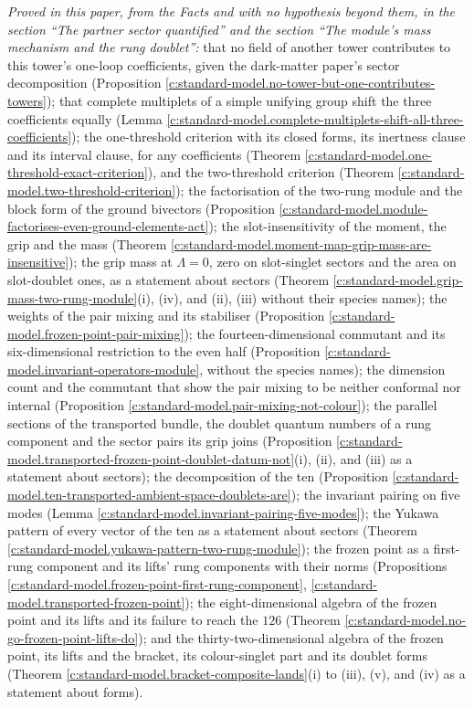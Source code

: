 \documentclass[11pt]{article}
\theoremstyle{definition}
\theoremstyle{plain}
\begin{document}
\emph{Proved in this paper, from the Facts and with no hypothesis beyond them, in the section ``The partner sector quantified'' and the section ``The module's mass mechanism and the rung doublet'':} that no field of another tower contributes to this tower's one-loop coefficients, given the dark-matter paper's sector decomposition (Proposition \ref{c:standard-model.no-tower-but-one-contributes-towers}); that complete multiplets of a simple unifying group shift the three coefficients equally (Lemma \ref{c:standard-model.complete-multiplets-shift-all-three-coefficients}); the one-threshold criterion with its closed forms, its inertness clause and its interval clause, for any coefficients (Theorem \ref{c:standard-model.one-threshold-exact-criterion}), and the two-threshold criterion (Theorem \ref{c:standard-model.two-threshold-criterion}); the factorisation of the two-rung module and the block form of the ground bivectors (Proposition \ref{c:standard-model.module-factorises-even-ground-elements-act}); the slot-insensitivity of the moment, the grip and the mass (Theorem \ref{c:standard-model.moment-map-grip-mass-are-insensitive}); the grip mass at $\Lambda = 0$, zero on slot-singlet sectors and the area on slot-doublet ones, as a statement about sectors (Theorem \ref{c:standard-model.grip-mass-two-rung-module}(i), (iv), and (ii), (iii) without their species names); the weights of the pair mixing and its stabiliser (Proposition \ref{c:standard-model.frozen-point-pair-mixing}); the fourteen-dimensional commutant and its six-dimensional restriction to the even half (Proposition \ref{c:standard-model.invariant-operators-module}, without the species names); the dimension count and the commutant that show the pair mixing to be neither conformal nor internal (Proposition \ref{c:standard-model.pair-mixing-not-colour}); the parallel sections of the transported bundle, the doublet quantum numbers of a rung component and the sector pairs its grip joins (Proposition \ref{c:standard-model.transported-frozen-point-doublet-datum-not}(i), (ii), and (iii) as a statement about sectors); the decomposition of the ten (Proposition \ref{c:standard-model.ten-transported-ambient-space-doublets-are}); the invariant pairing on five modes (Lemma \ref{c:standard-model.invariant-pairing-five-modes}); the Yukawa pattern of every vector of the ten as a statement about sectors (Theorem \ref{c:standard-model.yukawa-pattern-two-rung-module}); the frozen point as a first-rung component and its lifts' rung components with their norms (Propositions \ref{c:standard-model.frozen-point-first-rung-component}, \ref{c:standard-model.transported-frozen-point}); the eight-dimensional algebra of the frozen point and its lifts and its failure to reach the $126$ (Theorem \ref{c:standard-model.no-go-frozen-point-lifts-do}); and the thirty-two-dimensional algebra of the frozen point, its lifts and the bracket, its colour-singlet part and its doublet forms (Theorem \ref{c:standard-model.bracket-composite-lands}(i) to (iii), (v), and (iv) as a statement about forms).
\end{document}
